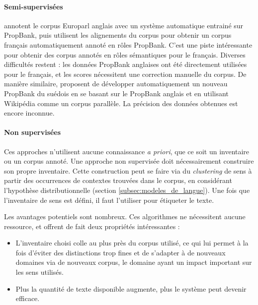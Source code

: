\paragraph{Semi-supervisées}

\cite{vanderplas2014cross} annotent le corpus Europarl anglais avec un système
automatique entrainé sur PropBank, puis utilisent les alignements du corpus
pour obtenir un corpus français automatiquement annoté en rôles PropBank. C'est
une piste intéressante pour obtenir des corpus annotés en rôles sémantiques
pour le français. Diverses difficultés restent : les données PropBank anglaises
ont été directement utilisées pour le français, et les scores nécessitent une
correction manuelle du corpus. De manière similaire, \cite{exner2014using}
proposent de développer automatiquement un nouveau PropBank du suédois en se
basant sur le PropBank anglais et en utilisant Wikipédia comme un corpus
parallèle. La précision des données obtenues est encore inconnue.

\paragraph{Non supervisées}


Ces approches n'utilisent aucune connaissance \textit{a priori}, que ce soit un
inventaire ou un corpus annoté. Une approche non supervisée doit nécessairement
construire son propre inventaire. Cette construction peut se faire via du
\textit{clustering} de sens à partir des occurrences de contextes trouvées dans
le corpus, en considérant l'hypothèse distributionnelle (section
\ref{subsec:modeles_de_langue}). Une fois que l'inventaire de sens est défini, il
faut l'utiliser pour étiqueter le texte.

Les avantages potentiels sont nombreux. Ces algorithmes ne nécessitent aucune
ressource, et offrent de fait deux propriétés intéressantes :

\begin{itemize}

    \item L'inventaire choisi colle au plus près du corpus utilisé, ce qui lui
        permet à la fois d'éviter des distinctions trop fines et de s'adapter à
        de nouveaux domaines via de nouveaux corpus, le domaine ayant un impact
        important sur les sens utilisés.

    \item Plus la quantité de texte disponible augmente, plus le système peut
        devenir efficace.

\end{itemize}

